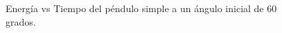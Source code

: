 \documentclass[aps,twocolumn,secnumarabic,nobalancelastpage,amsmath,amssymb,nofootinbib]{revtex4-1}
\begin{document}
			\begin{figure}[!htb]
				\caption{Energ\'ia vs Tiempo del p\'endulo simple a un \'angulo inicial de 60 grados.}
				\label{fig:EnergiaTiempo60}
			\end{figure} 
	
\end{document}
